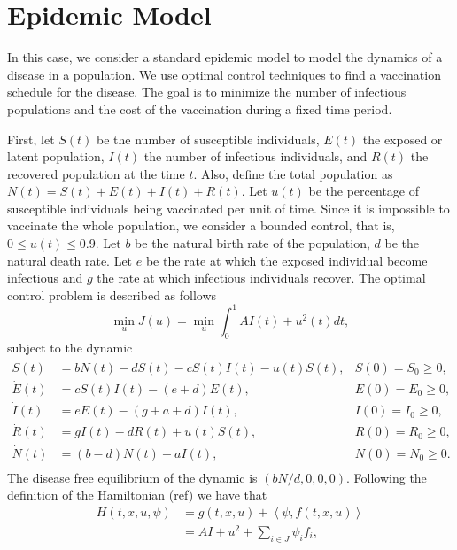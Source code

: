 \section{Epidemic Model}

    In this case, we consider a standard epidemic model to model the dynamics 
    of a disease in a population. We use optimal control techniques to find a 
    vaccination schedule for the disease. The goal is to minimize the number of 
    infectious populations and the cost of the vaccination during a fixed time 
    period. 

    \noindent First, let $S(t)$ be the number of susceptible individuals, $E(t)$ the exposed or latent population, $I(t)$ the number of infectious individuals, and $R(t)$ the recovered population at the time $t$. Also, define the total population as $N(t) = S(t) + E(t) + I(t) + R(t)$. Let $u(t)$ be the percentage of susceptible individuals being vaccinated per unit of time. Since it is impossible to vaccinate the whole population, we consider a bounded control, that is, $0 \leq u(t) \leq 0.9$. Let $b$ be the natural birth rate of the population, $d$ be the natural death rate. Let $e$ be the rate at which the exposed individual become infectious and $g$ the rate at which infectious individuals recover. The optimal control problem is described as follows
    $$
        \min_{u} J(u) = \min_{u} \int_{0}^{1} AI(t) + u^{2}(t) dt,
    $$
    subject to the dynamic
    \begin{align*}
        \dot{S}(t) &=
            bN(t) - dS(t) - cS(t)I(t) - u(t)S(t), & S(0) = S_0 \geq 0,   \\
        \dot{E}(t) &=
            cS(t)I(t) - (e + d)E(t), & E(0) = E_0 \geq 0,    \\
        \dot{I}(t) &=
            eE(t) - (g + a +d)I(t), & I(0) = I_0 \geq 0,     \\
        \dot{R}(t) &=
            gI(t) -dR(t) + u(t)S(t), & R(0) = R_0 \geq 0,    \\
        \dot{N}(t) &=
            (b - d)N(t) - aI(t), & N(0) = N_0 \geq 0.        \\
    \end{align*}
    The disease free equilibrium of the dynamic is $(bN/d,0,0,0)$. Following the
    definition of the Hamiltonian (ref) we have that
    \begin{align*}
        H(t,x,u,\psi) &= g(t,x,u) + \left < \psi , f(t,x,u) \right>\\
            &= AI + u^{2} + \sum_{i \in J} \psi_{i}f_{i},
    \end{align*}
